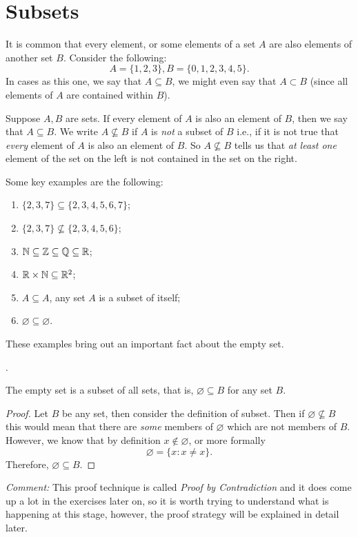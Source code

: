 \section{Subsets}
It is common that every element, or some elements of a set $A$ are also elements of another set $B$. Consider the following: 
$$
A=\{ 1,2,3 \}, B=\{ 0,1,2,3,4,5 \}.
$$
In cases as this one, we say that $A\subseteq B$, we might even say that $A\subset B$ (since all elements of $A$ are contained within $B$).

\begin{defn}
    Suppose $A,B$ are sets. If every element of $A$ is also an element of $B$, then we say that $A\subseteq B$. We write $A\not\subseteq B$ if $A$ is \emph{not} a subset of $B$ i.e., if it is not true that \emph{every} element of $A$ is also an element of $B$. So $A\not\subseteq B$ tells us that \emph{at least one} element of the set on the left is not contained in the set on the right.
\end{defn}

\begin{example}
    Some key examples are the following: 
    \begin{enumerate}
        \item $\{ 2,3,7 \}\subseteq \{ 2,3,4,5,6,7 \}$;
        \item $\{ 2,3,7 \}\not\subseteq \{ 2,3,4,5,6 \}$;
        \item $\mathbb{N}\subseteq\mathbb{Z}\subseteq\mathbb{Q}\subseteq\mathbb{R}$;
        \item $\mathbb{R}\times\mathbb{N}\subseteq\mathbb{R}^2$;
        \item $A\subseteq A$, any set $A$ is a subset of itself; 
        \item $\varnothing\subseteq\varnothing$.
    \end{enumerate}
\end{example}

These examples bring out an important fact about the empty set. 
\begin{center}
 .   
\end{center}

\begin{fact}
    The empty set is a subset of all sets, that is, $\varnothing\subseteq B$ for any set $B$.
    \begin{proof}
        Let $B$ be any set, then consider the definition of subset. Then if $\varnothing\not\subseteq B$ this would mean that there are \emph{some} members of $\varnothing$ which are not members of $B$. However, we know that by definition $x\notin\varnothing$, or more formally 
        $$
        \varnothing = \{ x:x\ne x \}.
        $$
        Therefore, $\varnothing\subseteq B$.
    \end{proof}
    \emph{Comment:} This proof technique is called \emph{Proof by Contradiction} and it does come up a lot in the exercises later on, so it is worth trying to understand what is happening at this stage, however, the proof strategy will be explained in detail later. 
\end{fact}

